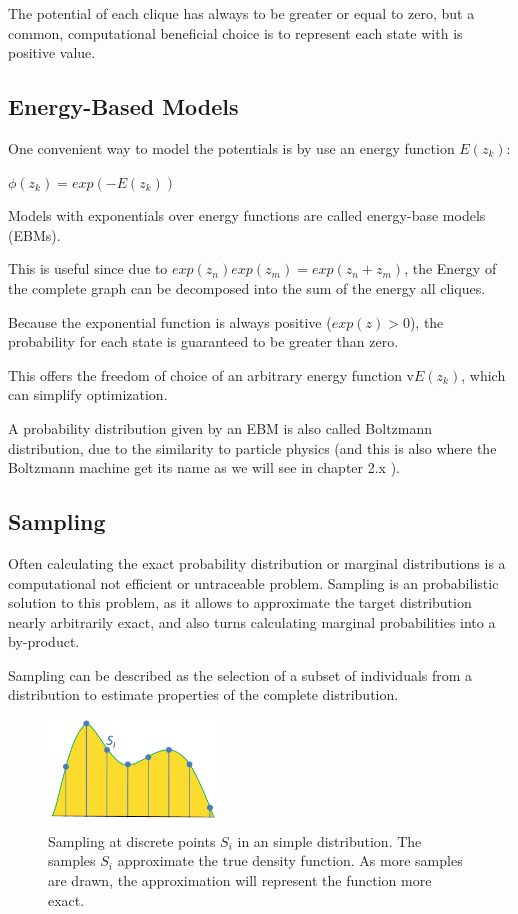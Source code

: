 The potential of each clique has always to be greater or equal to zero, but a common, computational beneficial choice is to represent each state with is positive value.



\subsection{Energy-Based Models}

One convenient way to model the potentials is by use an energy function $E(z_k)$: 

$\phi(z_k) = exp(- E(z_k))$

Models with exponentials over energy functions are called energy-base models (EBMs).

This is useful since due to $exp(z_n)exp(z_m) = exp(z_n+z_m)$, the Energy of the complete graph can be decomposed into the sum of the energy all cliques.

Because the exponential function is always positive ($exp(z) > 0$), the probability for each state is guaranteed to be greater than zero. 

This offers the freedom of choice of an arbitrary energy function v$E(z_k)$, which can simplify optimization. 

A probability distribution given by an EBM is also called Boltzmann distribution, due to the similarity to particle physics (and this is also where the Boltzmann machine get its name as we will see in chapter 2.x ).

\subsection{Sampling}

Often calculating the exact probability distribution or marginal distributions is a computational not efficient or untraceable problem.
Sampling is an probabilistic solution to this problem, as it allows to approximate the target distribution nearly arbitrarily exact, and also turns calculating marginal probabilities into a by-product.  

Sampling can be described as the selection of a subset of individuals from a distribution to estimate properties of the complete distribution.


\begin{figure}
	\centering
    	\includegraphics[width=0.4\textwidth]{imgs/sampling.png} 
    \caption{Sampling at discrete points $S_i$ in an simple distribution. The samples $S_i$ approximate the true density function. As more samples are drawn, the approximation will represent the function more exact.}
	\label{fig:Sampling}
\end{figure}

